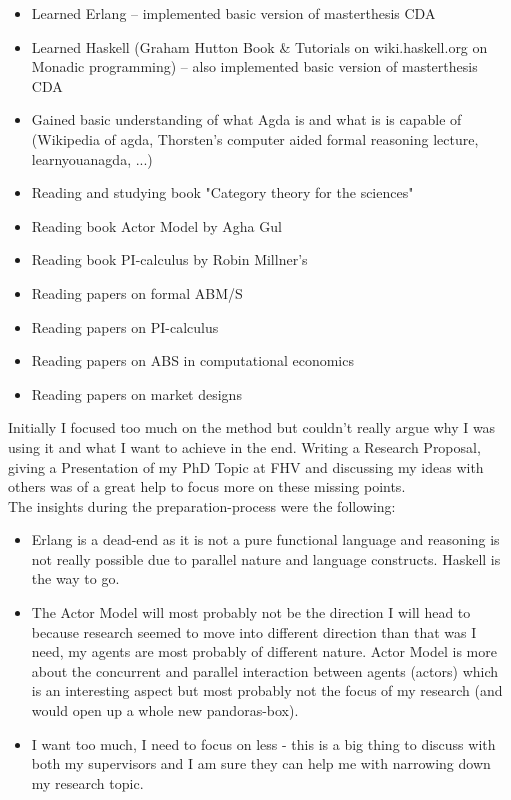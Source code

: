\begin{itemize}
\item Learned Erlang – implemented basic version of masterthesis CDA
\item Learned Haskell (Graham Hutton Book \& Tutorials on wiki.haskell.org on Monadic programming) – also implemented basic version of masterthesis CDA
\item Gained basic understanding of what Agda is and what is is capable of (Wikipedia of agda, Thorsten’s computer aided formal reasoning lecture, learnyouanagda, ...)
\item Reading and studying book "Category theory for the sciences"
\item Reading book Actor Model by Agha Gul
\item Reading book PI-calculus by Robin Millner’s
\item Reading papers on formal ABM/S
\item Reading papers on PI-calculus
\item Reading papers on ABS in computational economics
\item Reading papers on market designs
\end{itemize}

Initially I focused too much on the method but couldn't really argue why I was using it and what I want to achieve in the end. Writing a Research Proposal, giving a Presentation of my PhD Topic at FHV and discussing my ideas with others was of a great help to focus more on these missing points. \\

The insights during the preparation-process were the following:

\begin{itemize}
\item Erlang is a dead-end as it is not a pure functional language and reasoning is not really possible due to parallel nature and language constructs. Haskell is the way to go.
\item The Actor Model will most probably not be the direction I will head to because research seemed to move into different direction than that was I need, my agents are most probably of different nature. Actor Model is more about the concurrent and parallel interaction between agents (actors) which is an interesting aspect but most probably not the focus of my research (and would open up a whole new pandoras-box).
\item I want too much, I need to focus on less - this is a big thing to discuss with both my supervisors and I am sure they can help me with narrowing down my research topic.
\end{itemize}